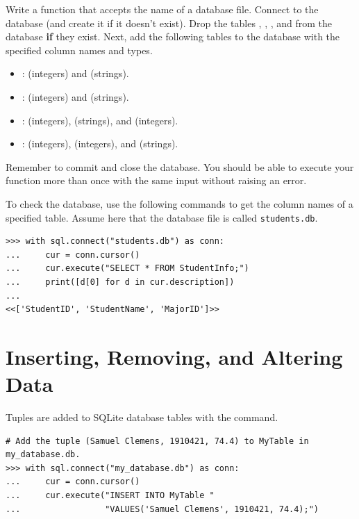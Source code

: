 \begin{problem} %
Write a function that accepts the name of a database file.
Connect to the database (and create it if it doesn't exist).
Drop the tables , , , and  from the database \textbf{if} they exist.
Next, add the following tables to the database with the specified column names and types.
\begin{itemize}
\item {}:  (integers) and  (strings).
\item {}:  (integers) and  (strings).
\item {}:  (integers),  (strings), and  (integers).
\item {}:  (integers),  (integers), and  (strings).
\end{itemize}
Remember to commit and close the database.
You should be able to execute your function more than once with the same input without raising an error.

To check the database, use the following commands to get the column names of a specified table.
Assume here that the database file is called \texttt{students.db}.

\begin{lstlisting}
>>> with sql.connect("students.db") as conn:
...     cur = conn.cursor()
...     cur.execute("SELECT * FROM StudentInfo;")
...     print([d[0] for d in cur.description])
...
<<['StudentID', 'StudentName', 'MajorID']>>
\end{lstlisting}
\label{prob:sql1-create-student-tables}
\end{problem}

\section*{Inserting, Removing, and Altering Data} %

Tuples are added to SQLite database tables with the  command.

\begin{lstlisting}
# Add the tuple (Samuel Clemens, 1910421, 74.4) to MyTable in my_database.db.
>>> with sql.connect("my_database.db") as conn:
...     cur = conn.cursor()
...     cur.execute("INSERT INTO MyTable "
...                 "VALUES('Samuel Clemens', 1910421, 74.4);")
\end{lstlisting}


